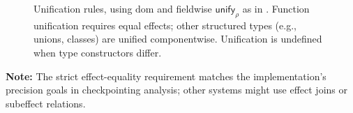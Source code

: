 \begin{figure}[t]
\centering
{}

\caption{Unification rules, using $\mathrm{dom}$ and fieldwise $\mathsf{unify}_{\rho}$ as in . Function unification requires equal effects; other structured types (e.g., unions, classes) are unified componentwise. Unification is undefined when type constructors differ.}
\label{fig:unification}
\end{figure}

\noindent\textbf{Note:} The strict effect-equality requirement matches the implementation’s precision goals in checkpointing analysis; other systems might use effect joins or subeffect relations.

